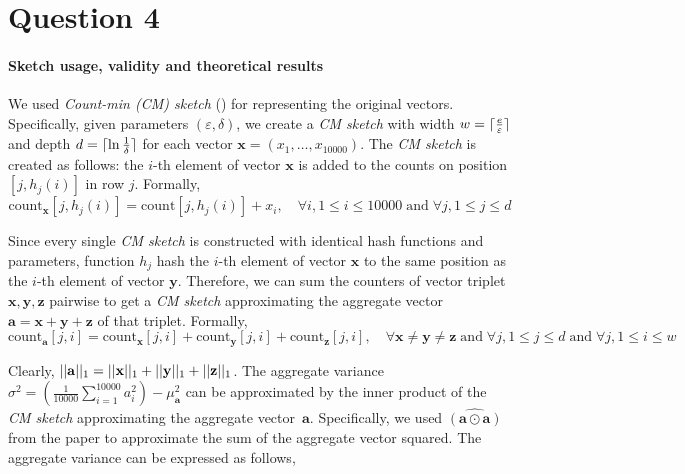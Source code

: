 \section{Question 4}
\paragraph{\textbf{Sketch usage, validity and theoretical results}}
We used \emph{Count-min (CM) sketch} (\cite{cm-sketch}) for representing the original vectors. Specifically, given parameters $(\varepsilon,\delta)$, we create a \emph{CM sketch} with width $w=\lceil {\frac{e}{\varepsilon}} \rceil$ and depth $d=\lceil {\ln{\frac{1}{\delta}}} \rceil$ for each vector $\mathbf{x}=(x_1,\dots,x_{10000})$. The \emph{CM sketch} is created as follows: the $i$-th element of vector $\mathbf{x}$ is added to the counts on position $[j, h_j(i)]$ in row $j$. Formally,
\begin{equation}
    \textrm{count}_\mathbf{x}[j, h_j(i)]=\textrm{count}[j, h_j(i)] + x_i,  \quad 
    \forall i,  1\leq i\leq 10000 \; \textrm{and} \; \forall j, 1\leq j\leq d 
\end{equation}

Since every single \emph{CM sketch} is constructed with identical hash functions and parameters, function $h_j$ hash the $i$-th element of vector $\mathbf{x}$ to the same position as the $i$-th element of vector $\mathbf{y}$. Therefore, we can sum the counters of vector triplet $\mathbf{x},\mathbf{y},\mathbf{z}$ pairwise to get a \emph{CM sketch} approximating the aggregate vector $\mathbf{a}=\mathbf{x}+\mathbf{y}+\mathbf{z}$ of that triplet. Formally,
\begin{equation}
    \textrm{count}_\mathbf{a}[j, i] = \textrm{count}_\mathbf{x}[j, i] + \textrm{count}_\mathbf{y}[j, i] + \textrm{count}_\mathbf{z}[j, i],  \quad 
    \forall \mathbf{x}\neq \mathbf{y}\neq \mathbf{z} \; \textrm{and} \;\forall j, 1\leq j\leq d \; \textrm{and} \; \forall j, 1\leq i\leq w
\end{equation}

Clearly, $\lvert\lvert {\mathbf{a}} \rvert\rvert_1=\lvert\lvert {\mathbf{x}} \rvert\rvert_1+\lvert\lvert {\mathbf{y}} \rvert\rvert_1+\lvert\lvert {\mathbf{z}} \rvert\rvert_1$. The aggregate variance $\sigma^2=\left(\frac{1}{10000}\sum_{i=1}^{10000} a_i^2\right)-\mu_{\mathbf{a}}^2$ can be approximated by the inner product of the \emph{CM sketch} approximating the aggregate vector~$\mathbf{a}$. Specifically, we used $\widehat{(\mathbf{a}\odot\mathbf{a})}$ from the \cite{cm-sketch} paper to approximate the sum of the aggregate vector squared. The aggregate variance can be expressed as follows, 

